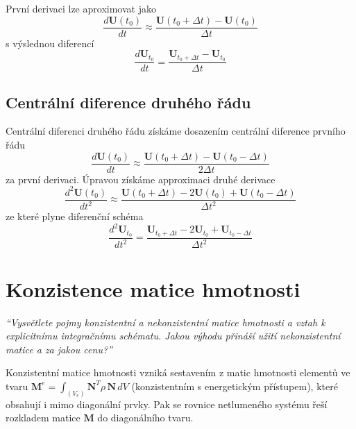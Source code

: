 \documentclass{article}
\begin{document}
	První derivaci lze aproximovat jako
	\begin{equation}
		\frac{d\bm{U}(t_0)}{dt} \approx \frac{\bm{U}(t_0+\Delta t) - \bm{U}(t_0)}{\Delta t}
	\end{equation}
	s výslednou diferencí
	\begin{equation}
		\frac{d\bm{U}_{t_0}}{dt} = \frac{\bm{U}_{t_0+\Delta t} - \bm{U}_{t_0}}{\Delta t}
	\end{equation}
	
	\subsection{Centrální diference druhého řádu}

	Centrální diferenci druhého řádu získáme dosazením centrální diference prvního řádu
	\begin{equation}
		\frac{d\bm{U}(t_0)}{dt} \approx \frac{\bm{U}(t_0+\Delta t) - \bm{U}(t_0-\Delta t)}{2\Delta t}
	\end{equation}
	za první derivaci.
	Úpravou získáme approximaci druhé derivace
	\begin{equation}
		\frac{d^2\bm{U}(t_0)}{dt^2}
		\approx
		\frac{ \bm{U}(t_0+\Delta t) - 2\bm{U}(t_0) + \bm{U}(t_0-\Delta t) }{\Delta t^2}
	\end{equation}
	ze které plyne diferenční schéma
	\begin{equation}
		\frac{d^2\bm{U}_{t_0}}{dt^2}
		=
		\frac{\bm{U}_{t_0+\Delta t} - 2\bm{U}_{t_0} + \bm{U}_{t_0-\Delta t}}{\Delta t^2}
	\end{equation}

	\section{Konzistence matice hmotnosti}
	\emph{``Vysvětlete pojmy konzistentní a nekonzistentní matice hmotnosti a vztah k explicitnímu integračnímu schématu. Jakou výhodu přináší užití nekonzistentní matice a za jakou cenu?''}

	Konzistentní matice hmotnosti vzniká sestavením z matic hmotnosti elementů ve tvaru $\bm{M}^e = \int_{(V_e)} \bm{N}^T \rho \, \bm{N} \, dV$ (konzistentním s energetickým přístupem), které obsahují i mimo diagonální prvky. Pak se rovnice netlumeného systému řeší rozkladem matice $\bm{M}$ do diagonálního tvaru.
\end{document}

